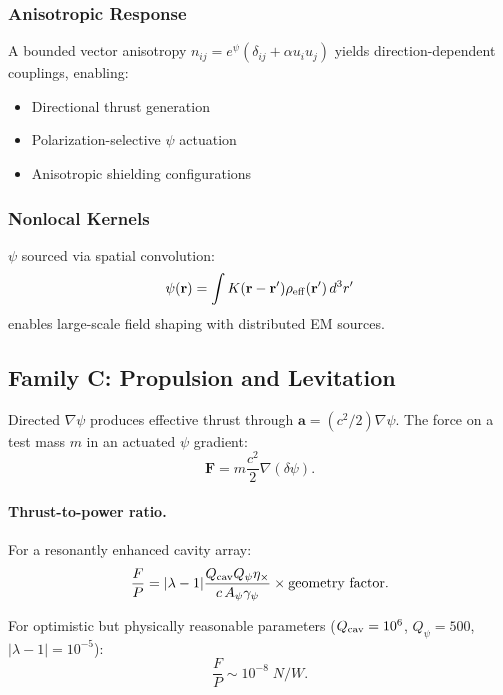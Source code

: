 \documentclass[aps,prd,twocolumn,superscriptaddress,floatfix,nofootinbib]{revtex4-2}
\newcommand{\avec}{\mathbf{a}}
\newcommand{\gpsi}{\gamma_\psi}
\newcommand{\lam}{\lambda}
\begin{document}
\subsubsection{Anisotropic Response}

A bounded vector anisotropy $n_{ij} = e^\psi(\delta_{ij} + \alpha u_i u_j)$
yields direction-dependent couplings, enabling:
\begin{itemize}[nosep]
\item Directional thrust generation
\item Polarization-selective $\psi$ actuation
\item Anisotropic shielding configurations
\end{itemize}

\subsubsection{Nonlocal Kernels}

$\psi$ sourced via spatial convolution:
\begin{equation}
\psi(\mathbf{r}) = \int K(\mathbf{r} - \mathbf{r}')
\rho_{\rm eff}(\mathbf{r}')\,d^3r'
\end{equation}
enables large-scale field shaping with distributed EM sources.

\subsection{Family C: Propulsion and Levitation}

Directed $\nabla\psi$ produces effective thrust through
$\avec = (c^2/2)\nabla\psi$. The force on a test mass $m$ in an
actuated $\psi$ gradient:
\begin{equation}
\mathbf{F} = m\frac{c^2}{2}\nabla(\delta\psi).
\end{equation}

\paragraph{Thrust-to-power ratio.}
For a resonantly enhanced cavity array:
\begin{equation}
\frac{F}{P} = |\lam-1|\frac{Q_{\rm cav}Q_\psi\eta_\times}{c\,A_\psi\gpsi}
\times \text{geometry factor}.
\end{equation}

For optimistic but physically reasonable parameters
($Q_{\rm cav} = 10^6$, $Q_\psi = 500$, $|\lam-1| = 10^{-5}$):
\begin{equation}
\frac{F}{P} \sim 10^{-8}\;\si{N/W}.
\end{equation}
\end{document}
